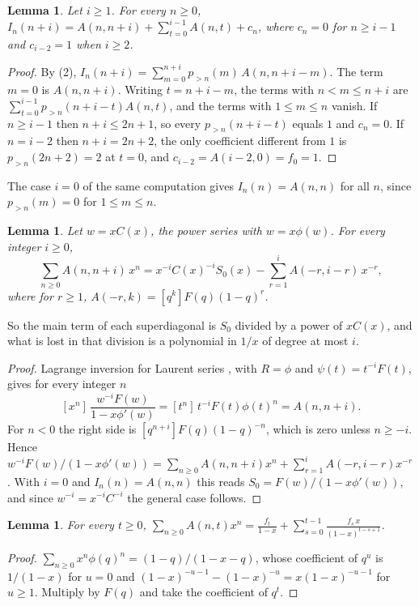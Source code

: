 \documentclass[11pt]{amsart}
\newtheorem{lemma}[theorem]{Lemma}
\theoremstyle{remark}\newtheorem*{remark}{Remark}
\begin{document}
\begin{lemma}\label{split}
Let $i\ge1$. For every $n\ge0$,
$I_n(n+i)=A(n,n+i)+\sum_{t=0}^{i-1}A(n,t)+c_n$, where $c_n=0$ for $n\ge i-1$ and $c_{i-2}=1$ when $i\ge2$.
\end{lemma}
\begin{proof}
By (2), $I_n(n+i)=\sum_{m=0}^{n+i}p_{>n}(m)\,A(n,n+i-m)$. The term $m=0$ is $A(n,n+i)$. Writing $t=n+i-m$, the terms
with $n<m\le n+i$ are $\sum_{t=0}^{i-1}p_{>n}(n+i-t)A(n,t)$, and the terms with $1\le m\le n$ vanish. If $n\ge i-1$ then
$n+i\le 2n+1$, so every $p_{>n}(n+i-t)$ equals $1$ and $c_n=0$. If $n=i-2$ then $n+i=2n+2$, the only coefficient
different from $1$ is $p_{>n}(2n+2)=2$ at $t=0$, and $c_{i-2}=A(i-2,0)=f_0=1$.
\end{proof}

The case $i=0$ of the same computation gives $I_n(n)=A(n,n)$ for all $n$, since $p_{>n}(m)=0$ for $1\le m\le n$.

\begin{lemma}\label{lagrange}
Let $w=xC(x)$, the power series with $w=x\phi(w)$. For every integer $i\ge0$,
\[
\sum_{n\ge0}A(n,n+i)\,x^n=x^{-i}C(x)^{-i}S_0(x)-\sum_{r=1}^{i}A(-r,i-r)\,x^{-r},
\]
where for $r\ge1$, $A(-r,k)=[q^k]F(q)(1-q)^r$.
\end{lemma}
So the main term of each superdiagonal is $S_0$ divided by a power of $xC(x)$, and what is lost in that division is a
polynomial in $1/x$ of degree at most $i$.
\begin{proof}
Lagrange inversion for Laurent series \cite[Theorem~2.1.1, (2.1.4)]{G}, with $R=\phi$ and $\psi(t)=t^{-i}F(t)$, gives for
every integer $n$
\[
[x^n]\,\frac{w^{-i}F(w)}{1-x\phi'(w)}=[t^n]\,t^{-i}F(t)\phi(t)^n=A(n,n+i).
\]
For $n<0$ the right side is $[q^{n+i}]F(q)(1-q)^{-n}$, which is zero unless $n\ge-i$. Hence
$w^{-i}F(w)/(1-x\phi'(w))=\sum_{n\ge0}A(n,n+i)x^n+\sum_{r=1}^{i}A(-r,i-r)x^{-r}$. With $i=0$ and $I_n(n)=A(n,n)$ this
reads $S_0=F(w)/(1-x\phi'(w))$, and since $w^{-i}=x^{-i}C^{-i}$ the general case follows.
\end{proof}

\begin{lemma}\label{columns}
For every $t\ge0$,
$\displaystyle\sum_{n\ge0}A(n,t)x^n=\frac{f_t}{1-x}+\sum_{s=0}^{t-1}\frac{f_s\,x}{(1-x)^{t-s+1}}$.
\end{lemma}
\begin{proof}
$\sum_{n\ge0}x^n\phi(q)^n=(1-q)/(1-x-q)$, whose coefficient of $q^u$ is $1/(1-x)$ for $u=0$ and
$(1-x)^{-u-1}-(1-x)^{-u}=x(1-x)^{-u-1}$ for $u\ge1$. Multiply by $F(q)$ and take the coefficient of $q^t$.
\end{proof}
\end{document}
